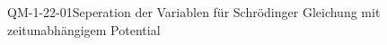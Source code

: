 
\begin{CONC}{QM-1-22-01}{Seperation der Variablen für Schrödinger Gleichung mit zeitunabhängigem Potential}
\end{CONC}
